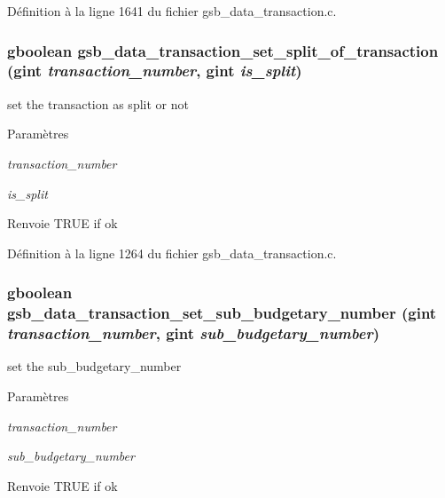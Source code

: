 Définition à la ligne 1641 du fichier gsb\_\-data\_\-transaction.c.

\subsubsection[{gsb\_\-data\_\-transaction\_\-set\_\-split\_\-of\_\-transaction}]{\setlength{\rightskip}{0pt plus 5cm}gboolean gsb\_\-data\_\-transaction\_\-set\_\-split\_\-of\_\-transaction (gint {\em transaction\_\-number}, \/  gint {\em is\_\-split})}\label{gsb__data__transaction_8h_a6296340e0b31e2f5433b37924b86b3e6}
set the transaction as split or not


\begin{DoxyParams}{Paramètres}
\item[{\em transaction\_\-number}]\item[{\em is\_\-split}]\end{DoxyParams}
\begin{DoxyReturn}{Renvoie}
TRUE if ok 
\end{DoxyReturn}


Définition à la ligne 1264 du fichier gsb\_\-data\_\-transaction.c.

\subsubsection[{gsb\_\-data\_\-transaction\_\-set\_\-sub\_\-budgetary\_\-number}]{\setlength{\rightskip}{0pt plus 5cm}gboolean gsb\_\-data\_\-transaction\_\-set\_\-sub\_\-budgetary\_\-number (gint {\em transaction\_\-number}, \/  gint {\em sub\_\-budgetary\_\-number})}\label{gsb__data__transaction_8h_aae141d1ea0866286b7d86231862e2b0a}
set the sub\_\-budgetary\_\-number 
\begin{DoxyParams}{Paramètres}
\item[{\em transaction\_\-number}]\item[{\em sub\_\-budgetary\_\-number}]\end{DoxyParams}
\begin{DoxyReturn}{Renvoie}
TRUE if ok 
\end{DoxyReturn}


